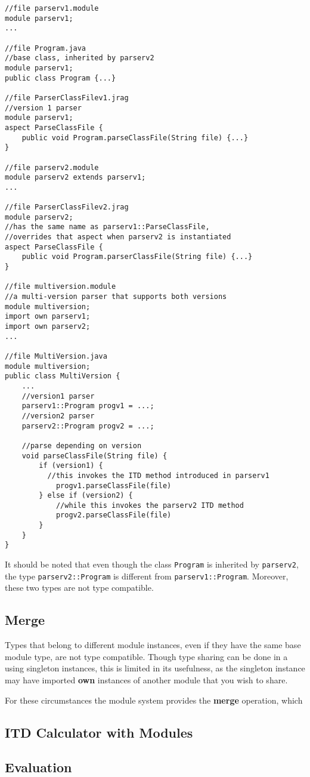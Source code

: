 \begin{lstlisting}
//file parserv1.module
module parserv1;
...

//file Program.java
//base class, inherited by parserv2
module parserv1;
public class Program {...}

//file ParserClassFilev1.jrag
//version 1 parser
module parserv1;
aspect ParseClassFile {
	public void Program.parseClassFile(String file) {...}
}

//file parserv2.module
module parserv2 extends parserv1;
...

//file ParserClassFilev2.jrag
module parserv2;
//has the same name as parserv1::ParseClassFile, 
//overrides that aspect when parserv2 is instantiated
aspect ParseClassFile {
	public void Program.parserClassFile(String file) {...}
}

//file multiversion.module
//a multi-version parser that supports both versions
module multiversion;
import own parserv1;
import own parserv2;
...

//file MultiVersion.java
module multiversion;
public class MultiVersion {
	...
	//version1 parser
	parserv1::Program progv1 = ...;
	//version2 parser
	parserv2::Program progv2 = ...;
	
	//parse depending on version
	void parseClassFile(String file) {
		if (version1) {
		  //this invokes the ITD method introduced in parserv1
			progv1.parseClassFile(file)
		} else if (version2) {
			//while this invokes the parserv2 ITD method
			progv2.parseClassFile(file)
		}
	}
}
\end{lstlisting}

It should be noted that even though the class \texttt{Program}
is inherited by \texttt{parserv2}, the type
\texttt{parserv2::Program} is different from \texttt{parserv1::Program}. Moreover,
these two types are not type compatible.

\subsection{Merge}

Types that belong to different module instances, even if they have the same
base module type, are not type compatible. Though type sharing can be done
in a using singleton instances, this is limited in its usefulness, as the singleton
instance may have imported \textbf{own} instances of another module that you wish to
share.

For these circumstances the module system provides the \textbf{merge} operation,
which 




\subsection{ITD Calculator with Modules}

\subsection{Evaluation}

